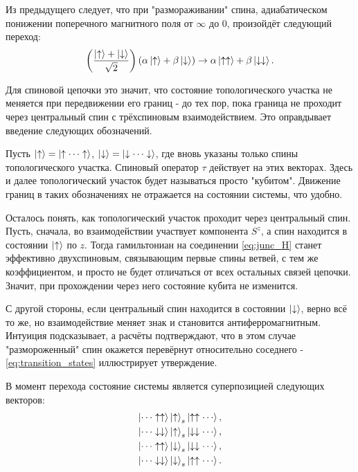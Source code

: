 \documentclass[a4paper,12pt]{article}
\theoremstyle{plain} %
\theoremstyle{definition} %
\theoremstyle{remark} %
\begin{document}
Из предыдущего следует, что при "размораживании"$ $ спина, адиабатическом понижении поперечного магнитного поля от $\infty$ до $0$, произойдёт следующий переход:
\begin{equation*}
    \left( \frac{\ket{\uparrow} + \ket{\downarrow}}{\sqrt{2}} \right) (\alpha \ket{\uparrow} + \beta \ket{\downarrow}) \rightarrow \alpha \ket{\uparrow\uparrow} + \beta \ket{\downarrow\downarrow}.
\end{equation*}

Для спиновой цепочки это значит, что состояние топологического участка не меняется при передвижении его границ -  до тех пор, пока граница не проходит через центральный спин с трёхспиновым взаимодействием. Это оправдывает введение следующих обозначений.

Пусть $\ket{\uparrow} = \ket{\uparrow \dotsm \uparrow}$, $\ket{\downarrow} = \ket{\downarrow \dotsm \downarrow}$, где вновь указаны только спины топологического участка. Спиновый оператор $\tau$ действует на этих векторах. Здесь и далее топологический участок будет называться просто "кубитом"$ $. Движение границ в таких обозначениях не отражается на состоянии системы, что удобно. 

Осталось понять, как топологический участок проходит через центральный спин. Пусть, сначала, во взаимодействии участвует компонента $S^z$, а спин находится в состоянии $\ket{\uparrow}$ по $z$. Тогда гамильтониан на соединении \ref{eq:junc_H} станет эффективно двухспиновым, связывающим первые спины ветвей, с тем же коэффициентом, и просто не будет отличаться от всех остальных связей цепочки. Значит, при прохождении через него состояние кубита не изменится.

С другой стороны, если центральный спин находится в состоянии $\ket{\downarrow}$, верно всё то же, но взаимодействие меняет знак и становится антиферромагнитным. Интуиция подсказывает, а расчёты подтверждают, что в этом случае "размороженный"$ $ спин окажется перевёрнут относительно соседнего - \ref{eq:transition_states} иллюстрирует утверждение.

В момент перехода состояние системы является суперпозицией следующих векторов:
\begin{equation}
\begin{split}
    \ket{\dotsm \uparrow \uparrow} \ket{\uparrow}_s \ket{\uparrow \uparrow \dotsm}, \\
    \ket{\dotsm \downarrow \downarrow} \ket{\uparrow}_s \ket{\downarrow \downarrow \dotsm}, \\
    \ket{\dotsm \uparrow \uparrow} \ket{\downarrow}_s \ket{\downarrow \downarrow \dotsm}, \\
    \ket{\dotsm \downarrow \downarrow} \ket{\downarrow}_s \ket{\uparrow \uparrow \dotsm}.
\end{split}
\label{eq:transition_states}
\end{equation}


\pagebreak



\end{document}
